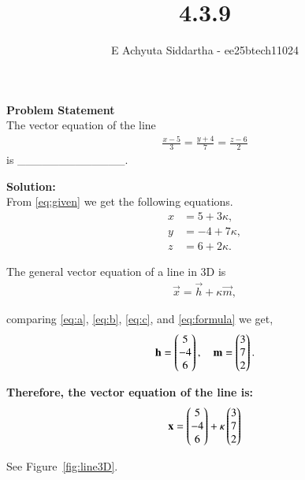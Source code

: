 \documentclass[journal]{IEEEtran}
\title{4.3.9}
\author{E Achyuta Siddartha - ee25btech11024}
\begin{document}
\maketitle

\noindent
\textbf{Problem Statement} \\
The vector equation of the line
\begin{align}
\frac{x - 5}{3} = \frac{y + 4}{7} = \frac{z - 6}{2}
\label{eq:given}
\end{align}
is \_\_\_\_\_\_\_\_\_\_\_\_\_.

\vspace{1.5em}

\noindent
\textbf{Solution:} \\

From \eqref{eq:given} we get the following equations.
\begin{align}
    x &= 5 + 3\kappa, \label{eq:a} \\ 
    y &= -4 + 7\kappa, \label{eq:b} \\ 
    z &= 6 + 2\kappa. \label{eq:c}
\end{align}

The general vector equation of a line in 3D is
\begin{align}
\vec{x} = \vec{h} + \kappa \vec{m},   
\label{eq:formula}
\end{align}

comparing \eqref{eq:a}, \eqref{eq:b}, \eqref{eq:c}, and \eqref{eq:formula} we get,
\begin{align}
\mathbf{h} = \begin{pmatrix}5 \\ -4 \\ 6\end{pmatrix}, \quad 
\mathbf{m} = \begin{pmatrix}3 \\ 7 \\ 2\end{pmatrix}.    
\end{align}


\noindent
\textbf{Therefore, the vector equation of the line is:}
\begin{align}
\mathbf{x} = \begin{pmatrix}5 \\ -4 \\ 6\end{pmatrix} + \kappa \begin{pmatrix}3 \\ 7 \\ 2\end{pmatrix}
\end{align}


See Figure~\ref{fig:line3D}.
\end{document}

